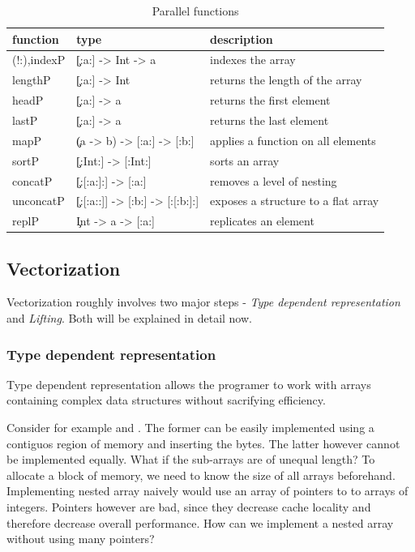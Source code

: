     \begin{table}[h]
      \caption{Parallel functions}
      \label{table:parfuns}
      \begin{tabular}{lll}
          \toprule
          function & type & description \\
          \midrule
          (!:),indexP & \c{[:a:] -> Int -> a} & indexes the array \\
          lengthP & \c{[:a:] -> Int} & returns the length of the array \\
          headP & \c{[:a:] -> a} & returns the first element\\
          lastP & \c{[:a:] -> a} & returns the last element \\
          mapP & \c{(a -> b) -> [:a:] -> [:b:]} & applies a function on all elements \\
          sortP & \c{[:Int:] -> [:Int:]} & sorts an array \\
          concatP & \c{[:[:a:]:] -> [:a:]} & removes a level of nesting \\
          unconcatP & \c{[:[:a::]] -> [:b:] -> [:[:b:]:]} & exposes a structure to a flat array \\
          replP & \c{Int -> a -> [:a:]} & replicates an element \\
      \end{tabular}
    \end{table}

    
  \subsection{Vectorization}
    Vectorization roughly involves two major steps -
    \emph{Type dependent representation} and \emph{Lifting}.
    Both will be explained in detail now.
  
    \subsubsection{Type dependent representation}
      Type dependent representation 
      allows the programer to work with arrays containing complex
      data structures without sacrifying efficiency.
      
      Consider for example \type{[:Int:]} and \type{[:[:Int:]:]}.
      The former can be easily implemented using a contiguos region
      of memory and inserting the bytes. The latter however cannot
      be implemented equally. What if the sub-arrays are of unequal length?
      To allocate a block of memory, we need to know the size
      of all arrays beforehand.
      Implementing nested array naively would use an array of pointers to
      to arrays of integers. Pointers however are bad, since they
      decrease cache locality and therefore decrease overall performance.
      How can we implement a nested array without using many pointers?
      
